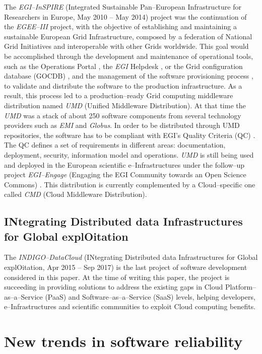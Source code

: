 \documentclass[journal]{IEEEtran}
\begin{document}
The {\sl EGI--InSPIRE} (Integrated Sustainable Pan--European Infrastructure for
Researchers in Europe, May 2010 -- May 2014) project \cite{cordis:egi-inspire}
was the continuation of the {\sl EGEE--III} project, with the objective of establishing and
maintaining a sustainable European Grid Infrastructure, composed by a federation of National
Grid Initiatives and interoperable with other Grids worldwide.
This goal would be accomplished through the
development and maintenance of operational tools, such as the Operations Portal \cite{egi-ops},
the {\sl EGI} Helpdesk \cite{ggus}, or the Grid configuration database (GOCDB) \cite{gocdb}, and the
management of the software provisioning process \cite{mario}, to validate and distribute the software to
the production infrastructure. As a result, this process led to a production--ready
Grid computing middleware distribution named {\sl UMD} (Unified Middleware Distribution). At that time the {\sl UMD}
was a stack of about 250 software components from several technology providers such
as {\sl EMI} and {\sl Globus}. In order to be distributed through UMD
repositories, the software has to be compliant with EGI's Quality Criteria (QC) \cite{egi-qc}. The
QC defines a set of requirements in different areas: documentation, deployment, security, information
model and operations.
{\sl UMD} is still being used and
deployed in the European scientific e--Infrastructures under the follow--up
project {\sl EGI--Engage} (Engaging the EGI Community towards an Open Science
Commons) \cite{cordis:egi-engage}. This distribution is currently complemented
by a Cloud--specific one called {\sl CMD} (Cloud Middleware Distribution).

\subsection{INtegrating Distributed data Infrastructures for Global
explOitation}

The {\sl INDIGO--DataCloud} (INtegrating Distributed data Infrastructures for Global
explOitation, Apr 2015 -- Sep 2017) \cite{cordis:indigo} is the last
project of software development considered in this paper. At the time of writing
this paper, the project is succeeding in providing solutions to address the existing gaps in
Cloud Platform--as--a--Service (PaaS) and Software--as--a--Service (SaaS) levels,
helping developers, e--Infrastructures and scientific communities to exploit
Cloud computing benefits.

\section{New trends in software reliability}
\label{sec:ntsr}
\end{document}
